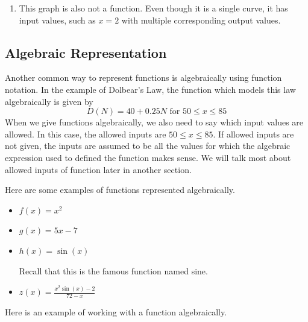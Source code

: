 \documentclass{ximera}
\begin{document}
\begin{example}
\begin{explanation}
\begin{enumerate}[label=\alph*.]
\item 
This graph is also not a function.  Even though it is a single curve, it has input values, such as $x=2$ with multiple corresponding output values.

\begin{image}
\end{image}

 \end{enumerate}
\end{explanation}
\end{example}
 
 \subsection{Algebraic Representation}
 Another common way to represent functions is algebraically using function notation.  In the example of Dolbear's Law, the function which models this law algebraically is given by 
 $$D(N)=40+0.25N \text{ for } 50 \leq x \leq 85$$
 When we give functions algebraically, we also need to say which input values are allowed.  In this case, the allowed inputs are $50 \leq x \leq 85$.  If allowed inputs are not given, the inputs are assumed to be all the values for which the algebraic expression used to defined the function makes sense.  We will talk most about allowed inputs of function later in another section.
 
 Here are some examples of functions represented algebraically.
 
\begin{itemize}
\item $f(x)=x^2$
\item $g(x)=5x-7$
\item $h(x)=\sin(x)$  

Recall that this is the famous function named sine.
\item $z(x)=\frac{x^2\sin(x)-2}{72-x}$
\end{itemize}

Here is an example of working with a function algebraically.
\end{document}
